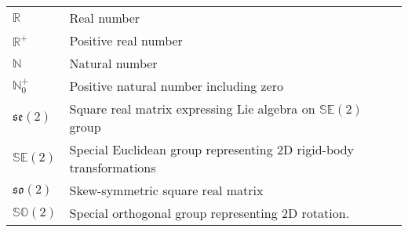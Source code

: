 \begin{spacing}{0.9}
\begin{multicols}{2}
\begin{table}[H]
\begin{tabular}{p{1.5cm} p{5cm}}
    $\mathbb{R}$ & Real number\\
    $\mathbb{R}^+$ & Positive real number\\
    $\mathbb{N}$ & Natural number\\
    $\mathbb{N}^+_0$ & Positive natural number including zero\\
    $\mathfrak{se}(2)$ & Square real matrix expressing Lie algebra on $\mathbb{SE}(2)$ group  \\
    $\mathbb{SE}(2)$ & Special Euclidean group representing 2D rigid-body transformations\\
    $\mathfrak{so}(2)$ & Skew-symmetric square real matrix\\
    $\mathbb{SO}(2)$ &  Special orthogonal group representing 2D rotation. \\
    \hline
    

    \end{tabular}
\end{table}



\end{multicols}
\end{spacing}
